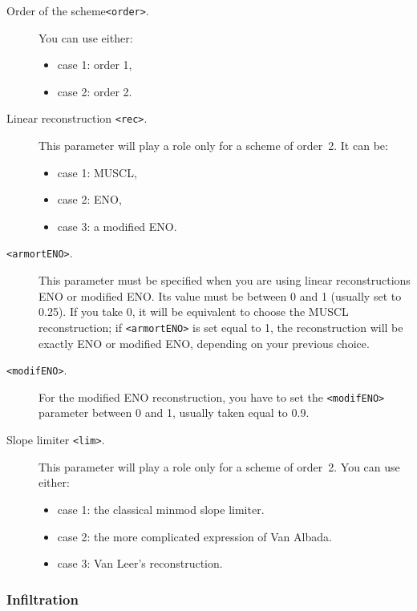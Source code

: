 \documentclass[a4paper, 11pt]{article}
\begin{document}
\begin{description}
	\item[Order of the scheme\texttt{<order>}.] You can use either:
		\begin{itemize}
			\item case 1: order 1,
			\item case 2: order 2.
		\end{itemize}
	\item[Linear reconstruction \texttt{<rec>}.] This parameter will play a role only for a scheme of order~2.
It can be:
		\begin{itemize}
			\item case 1: MUSCL,
			\item case 2: ENO,
			\item case 3: a modified ENO.
		\end{itemize}
	\item[\texttt{<armortENO>}.] This parameter must be specified when you are using linear reconstructions ENO or modified ENO.
	Its value must be between 0 and 1 (usually set to 0.25).  
	If you take 0, it will be equivalent to choose the MUSCL reconstruction;
	if \texttt{<armortENO>} is set equal to 1, the reconstruction will be exactly ENO or modified ENO,
	depending on your previous choice.  
	\item[\texttt{<modifENO>}.] For the modified ENO reconstruction, you have to set the \texttt{<modifENO>} parameter between 0 and 1, usually taken equal to 0.9.   
	\item[Slope limiter \texttt{<lim>}.] This parameter will play a role only for a scheme of order~2.
	You can use either: 
		\begin{itemize}
			\item case 1: the classical minmod slope limiter.
			\item case 2: the more complicated expression of Van Albada.
			\item case 3: Van Leer's reconstruction. 
		\end{itemize}
\end{description}

\subsubsection{Infiltration}
\end{document}
